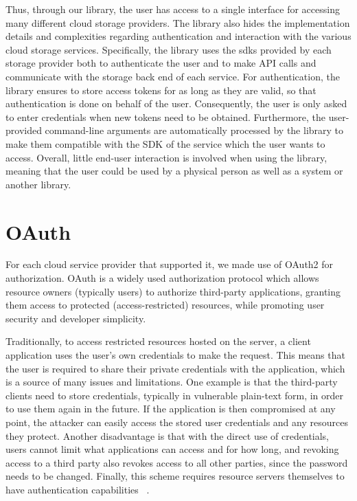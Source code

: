 Thus, through our library, the user has access to a single interface for accessing many different cloud storage providers. The library also hides the implementation details and complexities regarding authentication and interaction with the various cloud storage services. Specifically, the library uses the \ac{sdk}s provided by each storage provider both to authenticate the user and to make API calls and communicate with the storage back end of each service. For authentication, the library ensures to store access tokens for as long as they are valid, so that authentication is done on behalf of the user. Consequently, the user is only asked to enter credentials when new tokens need to be obtained. Furthermore, the user-provided command-line arguments are automatically processed by the library to make them compatible with the SDK of the service which the user wants to access. Overall, little end-user interaction is involved when using the library, meaning that the user could be used by a physical person as well as a system or another library.


\section{OAuth}
For each cloud service provider that supported it, we made use of OAuth2 for authorization. OAuth is a widely used authorization protocol which allows resource owners (typically users) to authorize third-party applications, granting them access to protected (access-restricted) resources, while promoting user security and developer simplicity.  

Traditionally, to access restricted resources hosted on the server, a client application uses the user's own credentials  to make the request. This means that the user is required to share their private credentials with the application, which is a source of many issues and limitations. One example is that the third-party clients need to store credentials, typically in vulnerable plain-text form,  in order to use them again in the future. If the application is then compromised at any point, the attacker can easily access the stored user credentials and any resources they protect. Another disadvantage is that with the direct use of credentials, users cannot limit what applications can access and for how long, and revoking access to a third party also revokes access to all other parties, since the password needs to be changed. Finally, this scheme requires resource servers themselves to have authentication capabilities ~\cite{oauth}.

